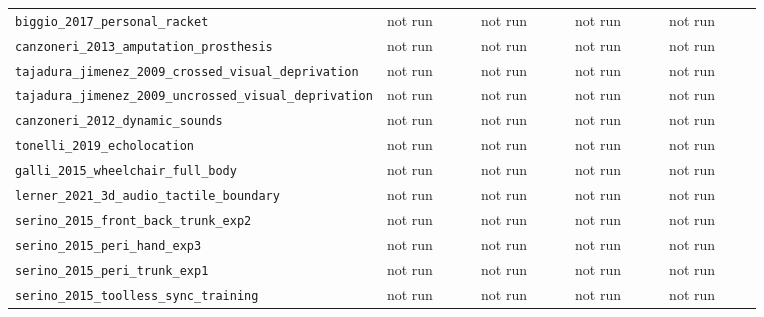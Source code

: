 \documentclass[11pt]{article}
\begin{document}
{\begin{longtable}{>{\raggedright\arraybackslash}p{0.35\linewidth}p{0.13\linewidth}p{0.13\linewidth}p{0.13\linewidth}p{0.13\linewidth}}
\texttt{biggio\_\allowbreak{}2017\_\allowbreak{}personal\_\allowbreak{}racket} & not run & not run & not run & not run \\
\texttt{canzoneri\_\allowbreak{}2013\_\allowbreak{}amputation\_\allowbreak{}prosthesis} & not run & not run & not run & not run \\
\texttt{tajadura\_\allowbreak{}jimenez\_\allowbreak{}2009\_\allowbreak{}crossed\_\allowbreak{}visual\_\allowbreak{}deprivation} & not run & not run & not run & not run \\
\texttt{tajadura\_\allowbreak{}jimenez\_\allowbreak{}2009\_\allowbreak{}uncrossed\_\allowbreak{}visual\_\allowbreak{}deprivation} & not run & not run & not run & not run \\
\texttt{canzoneri\_\allowbreak{}2012\_\allowbreak{}dynamic\_\allowbreak{}sounds} & not run & not run & not run & not run \\
\texttt{tonelli\_\allowbreak{}2019\_\allowbreak{}echolocation} & not run & not run & not run & not run \\
\texttt{galli\_\allowbreak{}2015\_\allowbreak{}wheelchair\_\allowbreak{}full\_\allowbreak{}body} & not run & not run & not run & not run \\
\texttt{lerner\_\allowbreak{}2021\_\allowbreak{}3d\_\allowbreak{}audio\_\allowbreak{}tactile\_\allowbreak{}boundary} & not run & not run & not run & not run \\
\texttt{serino\_\allowbreak{}2015\_\allowbreak{}front\_\allowbreak{}back\_\allowbreak{}trunk\_\allowbreak{}exp2} & not run & not run & not run & not run \\
\texttt{serino\_\allowbreak{}2015\_\allowbreak{}peri\_\allowbreak{}hand\_\allowbreak{}exp3} & not run & not run & not run & not run \\
\texttt{serino\_\allowbreak{}2015\_\allowbreak{}peri\_\allowbreak{}trunk\_\allowbreak{}exp1} & not run & not run & not run & not run \\
\texttt{serino\_\allowbreak{}2015\_\allowbreak{}toolless\_\allowbreak{}sync\_\allowbreak{}training} & not run & not run & not run & not run \\
\bottomrule
\end{longtable}
}
\end{document}
